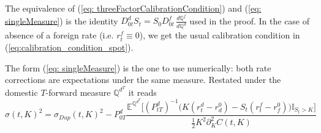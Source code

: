 
\begin{rem}
The equivalence of (\ref{eq: threeFactorCalibrationCondition}) and (\ref{eq: singleMeasure}) is the identity $D^d_{0t}S_t=S_0D^f_{0t}\,\frac{d\mathbb{Q}^f}{d\mathbb{Q}^d}$ used in the proof. In the case of absence of a foreign rate (i.e. $r^f_t\equiv 0$), we get the usual calibration condition in (\ref{eq:calibration_condition_spot}).
\end{rem}

The form (\ref{eq: singleMeasure}) is the one to use numerically: both rate corrections are expectations under the same measure. Restated under the domestic $T$-forward measure $\mathbb{Q}^{d^T}$ it reads
\begin{equation}\label{eq: threeFactorCalibrationConditionForward}
\sigma(t,K)^2 = \sigma_{Dup}(t,K)^2  - P^d_{0T}\frac{ \mathbb{E}^{\mathbb{Q}^{d^T}}\big[ (P^d_{tT})^{-1}\big(K(r_t^d-r^0_d)-S_t(r_t^f-r^0_f)\big)\mathbb{I}_{S_t>K} \big]}{ \frac{1}{2}K^2\partial^2_KC(t,K) }
\end{equation}

